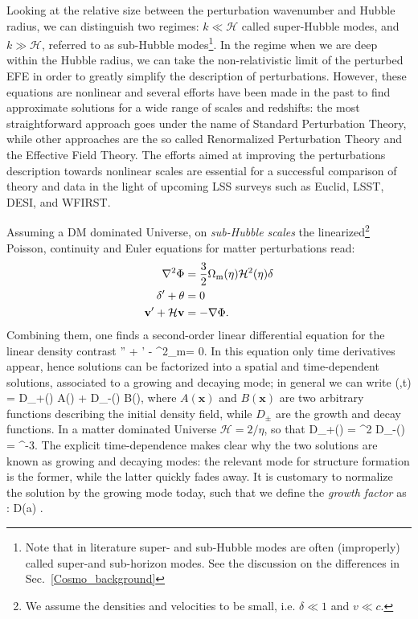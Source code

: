  Looking at
the relative size between the perturbation wavenumber and Hubble radius, we can distinguish two 
regimes: $k \ll \mathcal{H}$ called super-Hubble modes, and $k \gg \mathcal{H}$, referred to as 
sub-Hubble modes\footnote{Note that in literature super- and sub-Hubble modes are often (improperly) called super-and sub-horizon modes. See the discussion on the differences in 
Sec.~\eqref{Cosmo_background}}. In the regime when we are deep within the Hubble radius, we can take 
the non-relativistic limit of the perturbed \gls{EFE} in order to greatly simplify the description of perturbations.
However, these equations are nonlinear and several efforts have been made in the past to find 
approximate solutions for a wide range of scales and redshifts: the most straightforward approach goes
under the name of Standard Perturbation Theory, while other approaches are the so called Renormalized
Perturbation Theory and the Effective Field Theory. The efforts aimed at improving the perturbations 
description towards nonlinear scales are essential for a successful comparison of theory and data in the 
light of upcoming \gls{LSS} surveys such as Euclid, \gls{LSST}, \gls{DESI}, and \gls{WFIRST}.

Assuming a \gls{DM} dominated Universe, on \emph{sub-Hubble scales} the linearized\footnote{We assume 
the densities and velocities to be small, i.e. $\delta \ll 1$ and $v \ll c$.} Poisson, continuity and
Euler equations for matter perturbations read:
%
\begin{align}
\label{eq:pertEFEnewt}
\nabla^2\Phi &= \frac{3}{2}\Omega_{\rm m}(\eta) \mathcal{H}^2(\eta)\delta \\
\delta' + \theta &= 0 \\
\mathbf{v}' + \mathcal{H}\mathbf{v} &= - \nabla\Phi.
\end{align}
%
Combining them, one finds a second-order linear differential equation for the linear density contrast
%
\be
\label{eq:lineardelta}
\delta'' + \delta' - ^2\Omega_{\rm m}\delta = 0.
\ee
%
In this equation only time derivatives appear, hence solutions can be factorized into a spatial and 
time-dependent solutions, associated to a growing and decaying mode; in general we can write
%
\be
\delta(,t) = D_+(\eta) A() + D_-(\eta) B(),
\ee
%
where $A(\mathbf{x})$ and $B(\mathbf{x})$ are two arbitrary functions describing the initial density field, while $D_{\pm}$ are the growth and decay functions. In a matter dominated Universe $\mathcal{H} = 
2/\eta$, so that 
%
\be
D_+(\eta) = \eta^2 \quad {} \quad D_-(\eta) = \eta^{-3}.
\ee
%
The explicit time-dependence makes clear why the two solutions are known as growing and decaying 
modes: the relevant mode for structure formation is the former, while the latter quickly fades away.
It is customary to normalize the solution by the growing mode today, such that we define the \emph{growth factor} as :
%
\be
\label{eq:growth}
D(a) \equiv {}.
\ee
%

